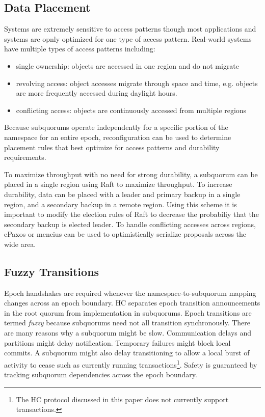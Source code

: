 \documentclass[11pt,conference]{IEEEtran}
\newcommand{\sub}{subquorum\xspace}
\newcommand{\subs}{subquorums\xspace}
\newcommand{\roo}{root quorum\xspace}
\begin{document}
\subsection{Data Placement}

Systems are extremely sensitive to access patterns though most applications and systems
are opnly optimized for one type of access pattern.
Real-world systems have multiple types of access patterns including:

\begin{itemize}
    \item single ownership: objects are accessed in one region and do not migrate
    \item revolving access: object accesses migrate through space and time, e.g. objects
    are more frequently accessed during daylight hours.
    \item conflicting access: objects are continuously accessed from multiple regions
\end{itemize}

Because \subs operate independently for a specific portion of the namespace for an
entire epoch, reconfiguration can be used to determine placement rules that best
optimize for access patterns and durability requirements.

To maximize throughput with no need for strong durability, a \sub can be placed in a
single region using Raft to maximize throughput.
To increase durability, data can be placed with a leader and primary backup in a single
region, and a secondary backup in a remote region.
Using this scheme it is important to modify the election rules of Raft to decrease the
probabiliy that the secondary backup is elected leader.
To handle conflicting accesses across regions, ePaxos or mencius can be used to
optimistically serialize proposals across the wide area.

\subsection{Fuzzy Transitions}

Epoch handshakes are required whenever the namespace-to-\sub mapping changes across an
epoch boundary.
HC separates epoch transition announcements in the
\roo from implementation in \subs.
Epoch transitions are termed \emph{fuzzy} because
\subs need not all transition synchronously.
There are many reasons why a \sub might be slow.
Communication delays and partitions might delay notification.
Temporary failures might block local commits.
A \sub might also delay transitioning to allow a local burst of activity to
cease such as currently running transactions\footnote{The HC protocol
discussed in this paper does not currently support transactions.}.
Safety is guaranteed by tracking \sub dependencies across the epoch boundary.
\end{document}
